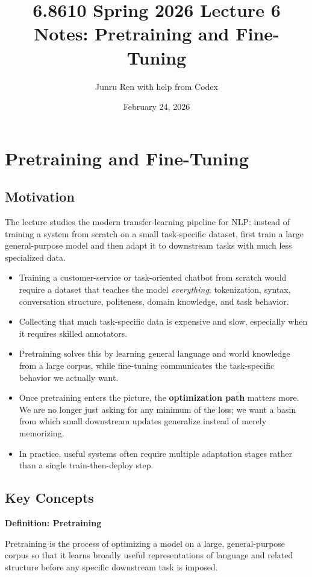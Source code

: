 \documentclass[11pt]{article}
\title{6.8610 Spring 2026 Lecture 6 Notes: Pretraining and Fine-Tuning}
\author{Junru Ren with help from Codex}
\date{February 24, 2026}
\begin{document}
\maketitle

\section{Pretraining and Fine-Tuning}

\subsection{Motivation}
The lecture studies the modern transfer-learning pipeline for NLP: instead of training a system from scratch on a small task-specific dataset, first train a large general-purpose model and then adapt it to downstream tasks with much less specialized data.

\begin{itemize}
    \item Training a customer-service or task-oriented chatbot from scratch would require a dataset that teaches the model \emph{everything}: tokenization, syntax, conversation structure, politeness, domain knowledge, and task behavior.
    \item Collecting that much task-specific data is expensive and slow, especially when it requires skilled annotators.
    \item Pretraining solves this by learning general language and world knowledge from a large corpus, while fine-tuning communicates the task-specific behavior we actually want.
    \item Once pretraining enters the picture, the \textbf{optimization path} matters more. We are no longer just asking for any minimum of the loss; we want a basin from which small downstream updates generalize instead of merely memorizing.
    \item In practice, useful systems often require multiple adaptation stages rather than a single train-then-deploy step.
\end{itemize}

\subsection{Key Concepts}
\textbf{Definition: Pretraining}

Pretraining is the process of optimizing a model on a large, general-purpose corpus so that it learns broadly useful representations of language and related structure before any specific downstream task is imposed.
\end{document}
